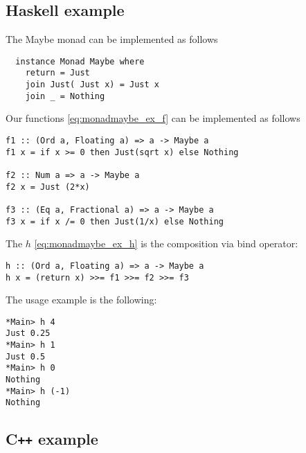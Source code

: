 \subsection{Haskell example}

\begin{example}
\label{ex:maybe_monad_haskell}
The Maybe monad can be implemented as follows
\begin{verbatim}
  instance Monad Maybe where
    return = Just
    join Just( Just x) = Just x
    join _ = Nothing
\end{verbatim} 

Our functions \eqref{eq:monadmaybe_ex_f} can be implemented as follows
\begin{verbatim}
f1 :: (Ord a, Floating a) => a -> Maybe a
f1 x = if x >= 0 then Just(sqrt x) else Nothing 

f2 :: Num a => a -> Maybe a
f2 x = Just (2*x)

f3 :: (Eq a, Fractional a) => a -> Maybe a
f3 x = if x /= 0 then Just(1/x) else Nothing
\end{verbatim}

The $h$ \eqref{eq:monadmaybe_ex_h} is the composition via bind
operator:
\begin{verbatim}
h :: (Ord a, Floating a) => a -> Maybe a
h x = (return x) >>= f1 >>= f2 >>= f3
\end{verbatim}

The usage example is the following:
\begin{verbatim}
*Main> h 4
Just 0.25
*Main> h 1
Just 0.5
*Main> h 0
Nothing
*Main> h (-1)
Nothing
\end{verbatim}

\end{example}

\subsection{C\texttt{++} example}


